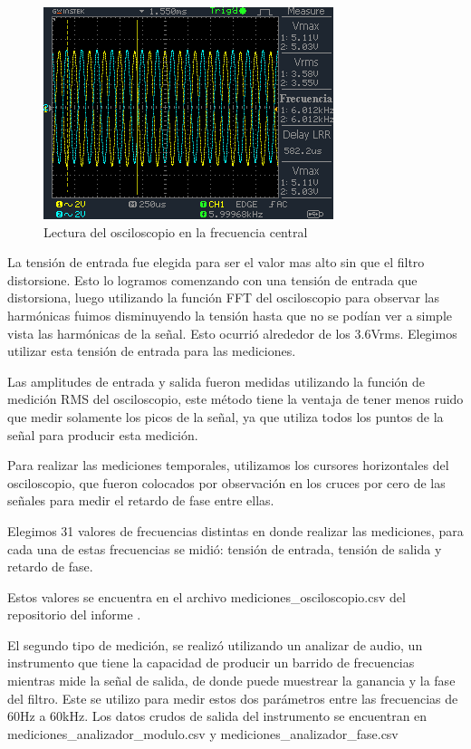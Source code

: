 \documentclass[11pt,a4paper]{report}
\begin{document}
\begin{figure}[h]
\centering
\includegraphics[scale=1]{figs/osc_f0.png}
\caption{Lectura del osciloscopio en la frecuencia central}
\end{figure}

La tensión de entrada fue elegida para ser el valor mas alto sin que el filtro distorsione. Esto lo logramos comenzando con una tensión de entrada que distorsiona, luego utilizando la función FFT del osciloscopio para observar las harmónicas fuimos disminuyendo la tensión hasta que no se podían ver a simple vista las harmónicas de la señal. Esto ocurrió alrededor de los 3.6Vrms. Elegimos utilizar esta tensión de entrada para las mediciones.

Las amplitudes de entrada y salida fueron medidas utilizando la función de medición RMS del osciloscopio, este método tiene la ventaja de tener menos ruido que medir solamente los picos de la señal, ya que utiliza todos los puntos de la señal para producir esta medición.

Para realizar las mediciones temporales, utilizamos los cursores horizontales del osciloscopio, que fueron colocados por observación en los cruces por cero de las señales para medir el retardo de fase entre ellas.

Elegimos 31 valores de frecuencias distintas en donde realizar las mediciones, para cada una de estas frecuencias se midió: tensión de entrada, tensión de salida y retardo de fase.

Estos valores se encuentra en el archivo mediciones\_osciloscopio.csv del repositorio del informe \cite{val_osc_file}.

El segundo tipo de medición, se realizó utilizando un analizar de audio, un instrumento que tiene la capacidad de producir un barrido de frecuencias mientras mide la señal de salida, de donde puede muestrear la ganancia y la fase del filtro. Este se utilizo para medir estos dos parámetros entre las frecuencias de 60Hz a 60kHz. Los datos crudos de salida del instrumento se encuentran en mediciones\_analizador\_modulo.csv \cite{val_mag_analizador_file} y mediciones\_analizador\_fase.csv \cite{val_fase_analizador_file}
\end{document}

